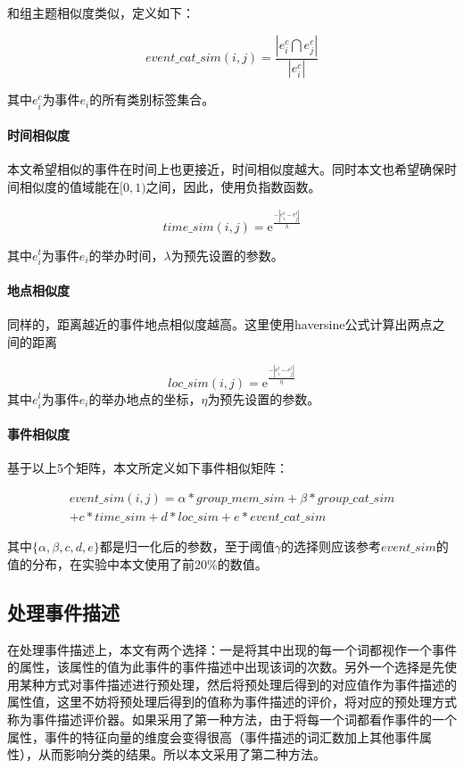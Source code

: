 和组主题相似度类似，定义如下：

\begin{equation}
event\_cat\_sim(i,j)=\frac{|e_i^c\bigcap e_j^c|}{|e_i^c|}
\end{equation}

其中$e_i^c$为事件$e_i$的所有类别标签集合。
\paragraph{时间相似度}

本文希望相似的事件在时间上也更接近，时间相似度越大。同时本文也希望确保时间相似度的值域能在\([0,1)\)之间，因此，使用负指数函数。

\begin{equation}   
time\_sim(i,j)=\mathrm{e}^\frac{-|e_i^t-e_j^t|}{\lambda}
\end{equation}

其中$e_i^t$为事件$e_i$的举办时间，\(\lambda\)为预先设置的参数。

\paragraph{地点相似度}

同样的，距离越近的事件地点相似度越高。这里使用haversine公式计算出两点之间的距离

\begin{equation}   
loc\_sim(i,j)=\mathrm{e}^\frac{-|e_i^l-e_j^l|}{\eta}
\end{equation}
其中$e_i^l$为事件$e_i$的举办地点的坐标，$\eta$为预先设置的参数。
\paragraph{事件相似度}
基于以上5个矩阵，本文所定义如下事件相似矩阵：

\begin{multline}   
event\_sim(i,j)=\alpha*group\_mem\_sim+\beta*group\_cat\_sim
\\+{c}*time\_sim+{d}*loc\_sim+{e}*event\_cat\_sim
\end{multline}

其中\(\{\alpha,\beta,{c},{d},{e}\}\)都是归一化后的参数，至于阈值\(\gamma\)的选择则应该参考\(event\_sim\)的值的分布，在实验中本文使用了前20\%的数值。

\subsection{处理事件描述}
在处理事件描述上，本文有两个选择：一是将其中出现的每一个词都视作一个事件的属性，该属性的值为此事件的事件描述中出现该词的次数。另外一个选择是先使用某种方式对事件描述进行预处理，然后将预处理后得到的对应值作为事件描述的属性值，这里不妨将预处理后得到的值称为事件描述的评价，将对应的预处理方式称为事件描述评价器。如果采用了第一种方法，由于将每一个词都看作事件的一个属性，事件的特征向量的维度会变得很高（事件描述的词汇数加上其他事件属性），从而影响分类的结果。所以本文采用了第二种方法。

